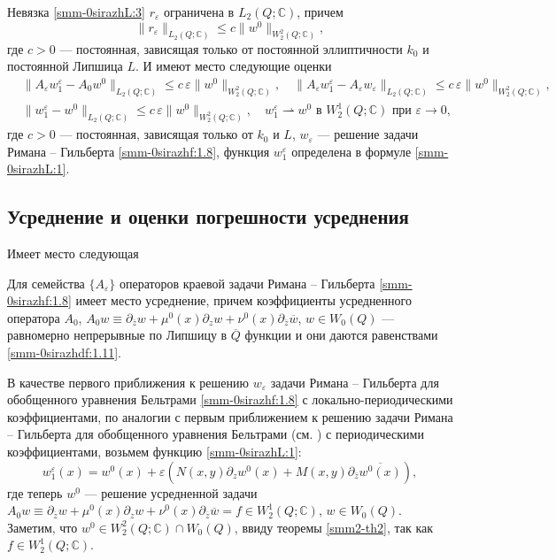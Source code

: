 \begin{lemma} { Невязка \eqref{smm-0sirazhL:3} $r_\varepsilon$ ограничена в $L_2(Q;\mathbb{C})$, причем}
\begin{equation}\label{smm-0sirazhL:0}
	\|r_\varepsilon\|_{L_2(Q;\mathbb{C})}\leqslant c\|w^0\|_{W_2^2(Q;\mathbb{C})},
\end{equation}
{ где $c>0$ --- постоянная, зависящая только от постоянной эллиптичности $k_0$ и постоянной Липшица $L$. И имеют место следующие оценки}
\begin{align}\label{smm-0sirazh4.12}
	&\|A_\varepsilon w_1^\varepsilon-A_0w^0\|_{L_2(Q; \mathbb{C})}\leqslant c\,\varepsilon\|w^0\|_
	{W_2^2 (Q; \mathbb{C})},\quad\|A_\varepsilon w_1^\varepsilon-A_\varepsilon w_\varepsilon\|_{L_2(Q; \mathbb{C})}\leqslant c\,\varepsilon\|w^0\|_
	{W_2^2 (Q; \mathbb{C})},\\\label{smm-0sirazh4.13}
	& \|w_1^\varepsilon-w^0\|_{L_2 (Q; \mathbb{C})}\leqslant c\,\varepsilon\|w^0\|_
	{W_2^2 (Q; \mathbb{C})},\quad w_1^\varepsilon\rightharpoonup w^0 \text{\ \ в \ \  } W_2^1(Q;\mathbb{C})\text{\  при \ \ } \varepsilon\to0,
\end{align}
{ где $c>0$ --- постоянная, зависящая только от $k_0$ и $L$,
	$w_\varepsilon$ ---  решение задачи Римана -- Гильберта \eqref{smm-0sirazhf:1.8}, функция
	$w_1^\varepsilon$ определена в формуле \eqref{smm-0sirazhL:1}}.
\end{lemma}



\subsection{Усреднение и оценки погрешности усреднения}

Имеет место  следующая

\begin{theorem} { Для семейства $\{A_\varepsilon\}$ операторов краевой
	задачи Римана -- Гильберта \eqref{smm-0sirazhf:1.8} имеет место усреднение, причем коэффициенты
	усредненного оператора $A_0$, $A_0w\equiv\partial_{\overline{z}}w+\mu^0(x)\partial_zw+\nu^0(x)\partial_{\overline{z}}
	\overline w$, $w\in W_0(Q)$ --- равномерно непрерывные  по Липшицу в $\overline{Q}$ функции и они даются равенствами \eqref{smm-0sirazhdf:1.11}.}
\end{theorem}

В качестве первого приближения к решению $w_\varepsilon$  задачи
Римана -- Гильберта  для обобщенного уравнения Бельтрами \eqref{smm-0sirazhf:1.8} с локально-периодическими коэффициентами, по аналогии с первым приближением к решению  задачи Римана -- Гильберта для обобщенного уравнения Бельтрами (см. \cite{smm-8}) с периодическими коэффициентами, возьмем функцию \eqref{smm-0sirazhL:1}:
$$ w_1^\varepsilon(x)=w^0(x)+\varepsilon\left(N(x,y)\partial_zw^0(x)+M(x,y)\partial_{\bar{z}}\overline{w^0(x)}\right),$$ где теперь $w^0$ --- решение усредненной задачи $A_0w\equiv\partial_{\overline{z}}w+\mu^0(x)\partial_zw+\nu^0(x)\partial_{\overline{z}}
\overline{w}=f\in W_2^1(Q;\mathbb{C})$, $w\in W_0(Q)$. Заметим, что $w^0\in W_2^2(Q;\mathbb{C})\cap W_0(Q)$, ввиду
теоремы \ref{smm2-th2}, так как $f\in W_2^1(Q;\mathbb{C})$.

